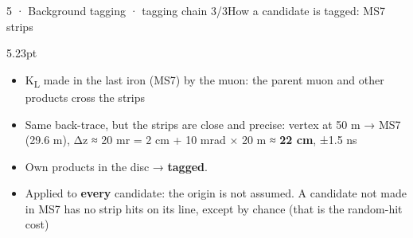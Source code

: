 \begin{btframe}{5 · Background tagging · tagging chain 3/3}{How a candidate is tagged: MS7 strips}
\begin{minipage}[c]{0.45\textwidth}
\begin{mathbox}[red]{5.23pt}
\end{mathbox}
{\fontsize{6.55pt}{7.37pt}\selectfont
\begin{itemize}
  \item K\textsubscript{L} made in the last iron (MS7) by the muon: the parent muon and other products cross the strips
  \item Same back-trace, but the strips are close and precise:\newline{} vertex at 50 m → MS7 (29.6 m), Δz ≈ 20 m\newline{}r = 2 cm + 10 mrad × 20 m ≈ \textbf{22 cm}, ±1.5 ns
  \item Own products in the disc → \textbf{tagged}.
  \item Applied to \textbf{every} candidate: the origin is not assumed. A candidate not made in MS7 has no strip hits on its line, except by chance (that is the random-hit cost)
\end{itemize}}
\end{minipage}\par

\end{btframe}


